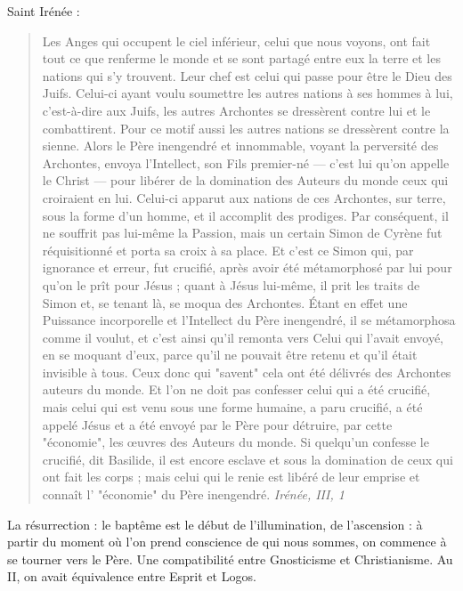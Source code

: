         Saint Irénée : 
        \begin{quote}
           Les Anges qui occupent le ciel  inférieur, celui que nous voyons, ont  fait  tout  ce que  renferme le  monde  et se sont partagé  entre  eux  la  terre  et  les  nations  qui  s'y  trouvent.  Leur  chef  est  celui  qui  passe  pour  être  le  Dieu  des  Juifs. Celui-ci  ayant  voulu  soumettre  les  autres  nations  à  ses  hommes  à  lui,  c'est-à-dire  aux  Juifs,  les  autres  Archontes se  dressèrent  contre  lui  et  le  combattirent.  Pour  ce  motif  aussi  les  autres  nations  se  dressèrent  contre  la  sienne. Alors  le  Père  inengendré  et  innommable,  voyant  la  perversité  des  Archontes,  envoya  l'Intellect,  son  Fils premier-né  — c'est  lui  qu'on  appelle  le  Christ  —  pour  libérer  de  la  domination  des  Auteurs  du  monde  ceux  qui croiraient  en  lui.  Celui-ci  apparut  aux  nations  de  ces  Archontes,  sur  terre,  sous  la  forme  d'un  homme,  et  il accomplit  des  prodiges.  Par  conséquent,  il  ne  souffrit  pas  lui-même  la  Passion,  mais  un  certain  Simon de  Cyrène fut  réquisitionné  et  porta  sa  croix  à  sa  place.  Et  c'est  ce  Simon  qui,  par  ignorance  et  erreur,  fut  crucifié,  après avoir  été  métamorphosé  par  lui  pour  qu'on  le  prît  pour  Jésus  ;  quant  à  Jésus  lui-même,  il  prit  les  traits  de  Simon et,  se  tenant  là,  se  moqua  des  Archontes.  Étant  en  effet  une  Puissance  incorporelle  et  l'Intellect  du  Père inengendré,  il  se  métamorphosa  comme  il  voulut,  et  c'est  ainsi  qu'il  remonta  vers  Celui  qui  l'avait  envoyé,  en  se moquant d'eux,  parce  qu'il  ne  pouvait  être  retenu  et  qu'il  était  invisible  à  tous.  Ceux  donc  qui  "savent"  cela  ont été  délivrés  des  Archontes  auteurs  du  monde.  Et  l'on  ne  doit  pas  confesser  celui  qui  a  été  crucifié,  mais  celui  qui est  venu  sous  une  forme  humaine,  a  paru  crucifié,  a  été  appelé  Jésus  et  a  été  envoyé  par  le  Père  pour  détruire, par  cette  "économie",  les  œuvres  des  Auteurs  du  monde.  Si  quelqu'un  confesse  le  crucifié,  dit  Basilide,  il  est encore  esclave  et  sous  la  domination  de  ceux  qui  ont  fait  les  corps  ;  mais  celui  qui  le  renie  est  libéré  de  leur emprise et connaît  l' "économie" du Père inengendré.  \textit{Irénée, III, 1}
        \end{quote}
    
    La résurrection : le baptême est le début de l'illumination, de l'ascension : à partir du moment où l'on prend conscience de qui nous sommes, on commence à se tourner vers le Père. Une compatibilité entre Gnosticisme et Christianisme.
    Au II, on avait équivalence entre Esprit et Logos.
    
